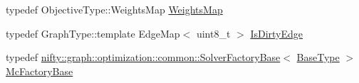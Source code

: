 \begin{DoxyCompactItemize}
\item 
typedef Objective\+Type\+::\+Weights\+Map \hyperlink{classnifty_1_1graph_1_1optimization_1_1multicut_1_1ChainedSolvers_a8eefc287a6a2bea7421b42447f1a1fdf}{Weights\+Map}
\item 
typedef Graph\+Type\+::template Edge\+Map$<$ uint8\+\_\+t $>$ \hyperlink{classnifty_1_1graph_1_1optimization_1_1multicut_1_1ChainedSolvers_af5ef940f03ca7ca1b1b08e5654a27191}{Is\+Dirty\+Edge}
\item 
typedef \hyperlink{classnifty_1_1graph_1_1optimization_1_1common_1_1SolverFactoryBase}{nifty\+::graph\+::optimization\+::common\+::\+Solver\+Factory\+Base}$<$ \hyperlink{classnifty_1_1graph_1_1optimization_1_1multicut_1_1ChainedSolvers_a3ada35119200b4ff4e1fc35383ecaa82}{Base\+Type} $>$ \hyperlink{classnifty_1_1graph_1_1optimization_1_1multicut_1_1ChainedSolvers_ae2a63d54e80124540754a948c9736a72}{Mc\+Factory\+Base}
\end{DoxyCompactItemize}
